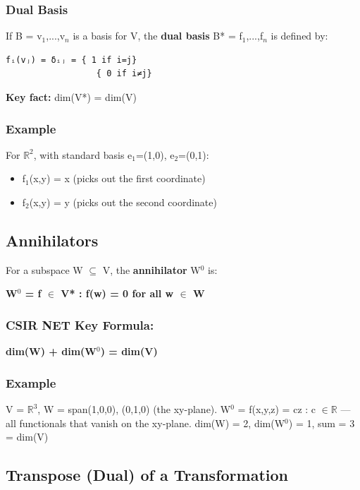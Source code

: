 \documentclass[12pt,a4paper,openany]{book}
\begin{document}
{{\subsubsection{Dual Basis}
If B = {v$_1$,...,v$_n$} is a basis for V, the \textbf{dual basis} B* = {f$_1$,...,f$_n$} is defined by:

\begin{verbatim}
fᵢ(vⱼ) = δᵢⱼ = { 1 if i=j}
                  { 0 if i≠j}
\end{verbatim}

\begin{tcolorbox}[colback=warningbg!30,colframe=warningborder,title=\textbf{Important -- Exam Alert},breakable,boxrule=1.5pt]
\textbf{Key fact:} dim(V*) = dim(V)
\end{tcolorbox}

\subsubsection{Example}
For $\mathbb{R}^2$, with standard basis {e$_1$=(1,0), e$_2$=(0,1)}:
\begin{itemize}[leftmargin=*]
  \item f$_1$(x,y) = x (picks out the first coordinate)
  \item f$_2$(x,y) = y (picks out the second coordinate)
\end{itemize}

\subsection{Annihilators}

For a subspace W $\subseteq$ V, the \textbf{annihilator} W$^0$ is:

\textbf{W$^0$ = {f $\in$ V* : f(w) = 0 for all w $\in$ W}}

\subsubsection{ CSIR NET Key Formula:}
\textbf{dim(W) + dim(W$^0$) = dim(V)}

\subsubsection{Example}
V = $\mathbb{R}^3$, W = span{(1,0,0), (0,1,0)} (the xy-plane).
W$^0$ = {f(x,y,z) = cz : c $\in\mathbb{R}$} — all functionals that vanish on the xy-plane.
dim(W) = 2, dim(W$^0$) = 1, sum = 3 = dim(V) 

\subsection{Transpose (Dual) of a Transformation}

}}
\end{document}
